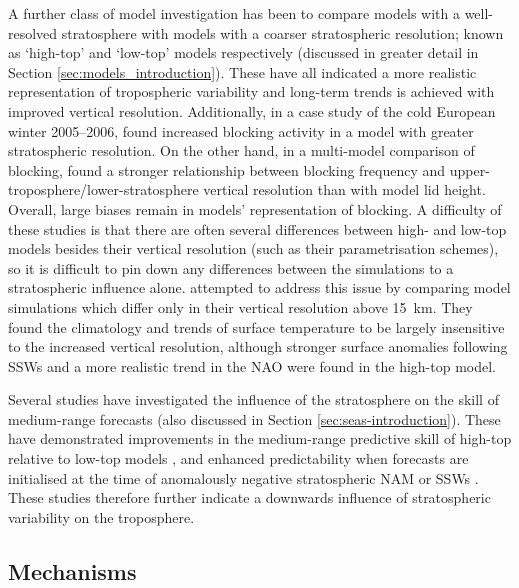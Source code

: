 A further class of model investigation has been to compare models with a
well-resolved stratosphere with models with a coarser stratospheric resolution;
known as `high-top' and `low-top' models respectively \citep{Huebener2007,
  Sigmond2008, Cagnazzo2009, Sassi2010, Scaife2011, Charlton-Perez2013}
(discussed in greater detail in Section \ref{sec:models_introduction}). These
have all indicated a more realistic representation of tropospheric variability
and long-term trends is achieved with improved vertical
resolution. Additionally, in a case study of the cold European winter
2005--2006, \citet{Scaife2008} found increased blocking activity in a model with
greater stratospheric resolution. On the other hand, in a multi-model comparison
of blocking, \citet{Anstey2013} found a stronger relationship between blocking
frequency and upper-troposphere/lower-stratosphere vertical resolution than with
model lid height. Overall, large biases remain in models' representation of
blocking. A difficulty of these studies is that there are often several
differences between high- and low-top models besides their vertical resolution
(such as their parametrisation schemes), so it is difficult to pin down any
differences between the simulations to a stratospheric influence
alone. \citet{Hardiman2012a} attempted to address this issue by comparing model
simulations which differ only in their vertical resolution above 15~km. They
found the climatology and trends of surface temperature to be largely
insensitive to the increased vertical resolution, although stronger surface
anomalies following SSWs and a more realistic trend in the NAO were found in the
high-top model.

Several studies have investigated the influence of the stratosphere on the skill
of medium-range forecasts (also discussed in Section
\ref{sec:seas-introduction}). These have demonstrated improvements in the
medium-range predictive skill of high-top relative to low-top models
\citep{Marshall2010,Roff2011}, and enhanced predictability when forecasts are
initialised at the time of anomalously negative stratospheric NAM or SSWs
\citep{Kuroda2008,Mukougawa2009,Sigmond2013}. These studies therefore further
indicate a downwards influence of stratospheric variability on the troposphere. 




\subsection{Mechanisms}
\label{sec:mechanisms}

